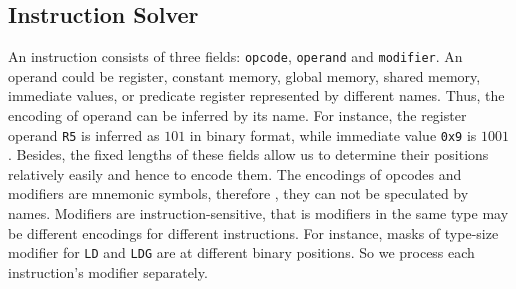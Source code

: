\subsection{Instruction Solver}


An instruction consists of three fields: {\tt opcode}, {\tt operand} and {\tt modifier}. An operand could be register, 
constant memory, global memory, shared memory, immediate values, or predicate register represented by different names.
Thus, the encoding of operand can be inferred by its name. For instance, the register operand {\tt R5} is
inferred as $101$ in binary format, while immediate value {\tt 0x9} is $1001$. 
Besides, the fixed lengths of these fields allow us to determine their positions  relatively easily and hence to encode them. 
The encodings of opcodes and modifiers are mnemonic symbols, therefore
, they can not be speculated by names. 
Modifiers are instruction-sensitive, that is modifiers in the same type may be different encodings for different instructions. 
For instance, masks of type-size
modifier for {\tt LD} and {\tt LDG} are at different binary positions. So we process each instruction's modifier separately. 


